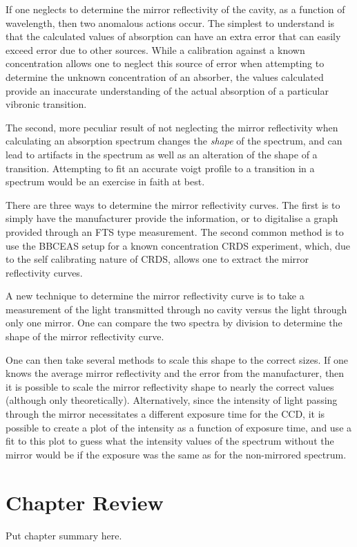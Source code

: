 If one neglects to determine the mirror reflectivity of the cavity, as a
function of wavelength, then two anomalous actions occur. The simplest to
understand is that the calculated values of absorption can have an extra error
that can easily exceed error due to other sources. While a calibration against
a known concentration allows one to neglect this source of error when
attempting to determine the unknown concentration of an absorber, the values
calculated provide an inaccurate understanding of the actual absorption of a
particular vibronic transition.

The second, more peculiar result of not neglecting the mirror reflectivity
when calculating an absorption spectrum changes the \emph{shape} of the
spectrum, and can lead to artifacts in the spectrum as well as an alteration
of the shape of a transition. Attempting to fit an accurate voigt profile to a
transition in a spectrum would be an exercise in faith at best.

There are three ways to determine the mirror reflectivity curves. The first is
to simply have the manufacturer provide the information, or to digitalise a
graph provided through an \ac{FTS} type measurement. The second common method
is to use the \ac{BBCEAS} setup for a known concentration \ac{CRDS}
experiment, which, due to the self calibrating nature of \ac{CRDS}, allows one
to extract the mirror reflectivity curves.

A new technique to determine the mirror reflectivity curve is to take a
measurement of the light transmitted through no cavity versus the light
through only one mirror. One can compare the two spectra by division to
determine the shape of the mirror reflectivity curve.

One can then take several methods to scale this shape to the correct sizes. If
one knows the average mirror reflectivity and the error from the manufacturer,
then it is possible to scale the mirror reflectivity shape to nearly the
correct values (although only theoretically). Alternatively, since the
intensity of light passing through the mirror necessitates a different
exposure time for the \ac{CCD}, it is possible to create a plot of the
intensity as a function of exposure time, and use a fit to this plot to guess
what the intensity values of the spectrum without the mirror would be if the
exposure was the same as for the non-mirrored spectrum.

\section*{Chapter Review}
Put chapter summary here.
